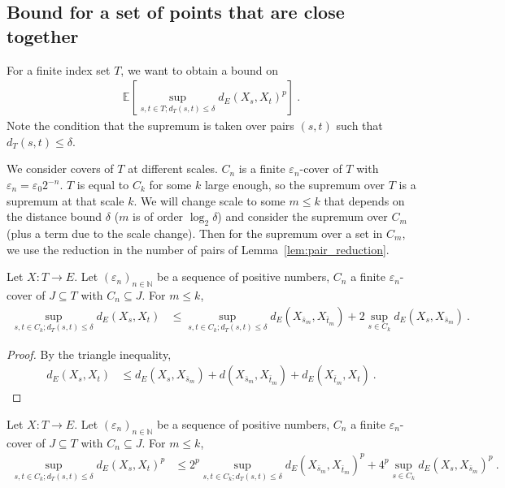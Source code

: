 \subsection{Bound for a set of points that are close together}

For a finite index set $T$, we want to obtain a bound on
\begin{align*}
  \mathbb{E}\left[ \sup_{s, t \in T; d_T(s, t) \le \delta} d_E(X_s, X_t)^p \right] \: .
\end{align*}
Note the condition that the supremum is taken over pairs $(s, t)$ such that $d_T(s, t) \le \delta$.

We consider covers of $T$ at different scales. $C_n$ is a finite $\varepsilon_n$-cover of $T$ with $\varepsilon_n = \varepsilon_0 2^{-n}$.
$T$ is equal to $C_k$ for some $k$ large enough, so the supremum over $T$ is a supremum at that scale $k$.
We will change scale to some $m \le k$ that depends on the distance bound $\delta$ ($m$ is of order $\log_2 \delta$) and consider the supremum over $C_m$ (plus a term due to the scale change).
Then for the supremum over a set in $C_m$, we use the reduction in the number of pairs of Lemma~\ref{lem:pair_reduction}.

\begin{lemma}\label{lem:scale_change}
  \leanok
Let $X : T \to E$.
Let $(\varepsilon_n)_{n \in \mathbb{N}}$ be a sequence of positive numbers, $C_n$ a finite $\varepsilon_n$-cover of $J \subseteq T$ with $C_n \subseteq J$.
For $m \le k$,
\begin{align*}
  \sup_{s, t \in C_k; d_T(s, t) \le \delta} d_E(X_s, X_t)
  &\le \sup_{s, t \in C_k; d_T(s, t) \le \delta} d_E(X_{\bar{s}_m}, X_{\bar{t}_m})
    + 2 \sup_{s \in C_k} d_E(X_s, X_{\bar{s}_m})
  \: .
\end{align*}
\end{lemma}

\begin{proof}\leanok
By the triangle inequality,
\begin{align*}
  d_E(X_s, X_t)
  &\le d_E(X_s, X_{\bar{s}_m}) + d(X_{\bar{s}_m}, X_{\bar{t}_m}) + d_E(X_{\bar{t}_m}, X_t)
  \: .
\end{align*}
\end{proof}


\begin{corollary}\label{cor:scale_change_rpow}
  \leanok
Let $X : T \to E$.
Let $(\varepsilon_n)_{n \in \mathbb{N}}$ be a sequence of positive numbers, $C_n$ a finite $\varepsilon_n$-cover of $J \subseteq T$ with $C_n \subseteq J$.
For $m \le k$,
\begin{align*}
  \sup_{s, t \in C_k; d_T(s, t) \le \delta} d_E(X_s, X_t)^p
  &\le 2^p \sup_{s, t \in C_k; d_T(s, t) \le \delta} d_E(X_{\bar{s}_m}, X_{\bar{t}_m})^p
    + 4^p \sup_{s \in C_k} d_E(X_s, X_{\bar{s}_m})^p
  \: .
\end{align*}
\end{corollary}

